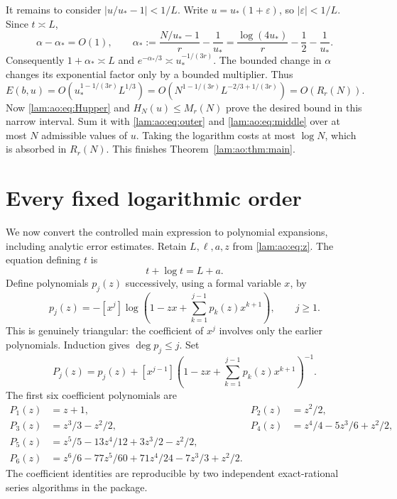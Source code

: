\documentclass[11pt,a4paper]{article}
\numberwithin{equation}{section}
\theoremstyle{remark}
\begin{document}
It remains to consider $|u/u_*-1|<1/L$. Write $u=u_*(1+\varepsilon)$, so $|\varepsilon|<1/L$. Since $t\asymp L$,
\[
 \alpha-\alpha_*=O(1),\qquad
 \alpha_*:=\frac{N/u_*-1}r-\frac1{u_*}
           =\frac{\log(4u_*)}r-\frac12-\frac1{u_*}.
\]
Consequently $1+\alpha_*\asymp L$ and $e^{-\alpha_*/3}\asymp u_*^{-1/(3r)}$. The bounded change in $\alpha$ changes its exponential factor only by a bounded multiplier. Thus
\begin{equation}\label{lam:ao:eq:Enarrow}
 E(b,u)=O(u_*^{1-1/(3r)}L^{1/3})
       =O(N^{1-1/(3r)}L^{-2/3+1/(3r)})=O(R_r(N)).
\end{equation}
Now \eqref{lam:ao:eq:Hupper} and $H_N(u)\le M_r(N)$ prove the desired bound in this narrow interval. Sum it with \eqref{lam:ao:eq:outer} and \eqref{lam:ao:eq:middle} over at most $N$ admissible values of $u$. Taking the logarithm costs at most $\log N$, which is absorbed in $R_r(N)$. This finishes Theorem~\ref{lam:ao:thm:main}.

\section{Every fixed logarithmic order}\label{lam:ao:sec:expansion}
We now convert the controlled main expression to polynomial expansions, including analytic error estimates. Retain $L,\ell,a,z$ from \eqref{lam:ao:eq:z}. The equation defining $t$ is
\begin{equation}\label{lam:ao:eq:timplicit}
 t+\log t=L+a.
\end{equation}
Define polynomials $p_j(z)$ successively, using a formal variable $x$, by
\begin{equation}\label{lam:ao:eq:p}
 p_j(z)=-[x^j]\log\left(1-zx+\sum_{k=1}^{j-1}p_k(z)x^{k+1}\right),\qquad j\ge1.
\end{equation}
This is genuinely triangular: the coefficient of $x^j$ involves only the earlier polynomials. Induction gives $\deg p_j\le j$. Set
\begin{equation}\label{lam:ao:eq:P}
 P_j(z)=p_j(z)+[x^{j-1}]
       \left(1-zx+\sum_{k=1}^{j-1}p_k(z)x^{k+1}\right)^{-1}.
\end{equation}
The first six coefficient polynomials are
\begin{align}
 P_1(z)&=z+1,& P_2(z)&=z^2/2,\nonumber\\
 P_3(z)&=z^3/3-z^2/2,& P_4(z)&=z^4/4-5z^3/6+z^2/2,\label{lam:ao:eq:Pfirst}\\
 P_5(z)&=z^5/5-13z^4/12+3z^3/2-z^2/2,\nonumber\\
 P_6(z)&=z^6/6-77z^5/60+71z^4/24-7z^3/3+z^2/2.\nonumber
\end{align}
The coefficient identities are reproducible by two independent exact-rational series algorithms in the package.
\end{document}
